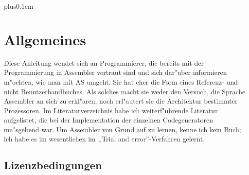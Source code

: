 \documentclass[12pt,a4paper,twoside]{report}
\newif\ifelektor
\begin{document}
\clearpage


\ifelektor
\thispagestyle{empty} \
\clearpage
\thispagestyle{empty} \
\clearpage
\fi


{\parskip 0cm plus0.1cm \tableofcontents}


\cleardoublepage
\chapter{Allgemeines}

Diese Anleitung wendet sich an Programmierer, die bereits mit der Programmierung in Assembler
vertraut sind und sich dar"uber informieren m"ochten, wie man mit AS umgeht.  Sie
hat eher die Form eines Referenz- und nicht Benutzerhandbuches.  Als solches
macht sie weder den Versuch, die Sprache Assembler an sich zu erkl"aren, noch
erl"autert sie die Architektur bestimmter Prozessoren.  Im Literaturverzeichnis
habe ich weiterf"uhrende Literatur aufgelistet, die bei der Implementation der
einzelnen Codegeneratoren ma"sgebend war.  Um Assembler von Grund auf zu
lernen, kenne ich kein Buch; ich habe es im wesentlichen im ,,Trial and
error''-Verfahren gelernt.


\section{Lizenzbedingungen}
\label{SectLicense}
\end{document}
